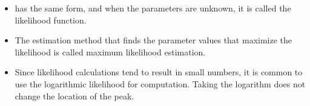 \begin{itemize}
	\item {} has the same form, and when the parameters are unknown, it is called the likelihood function.
	\item The estimation method that finds the parameter values that maximize the likelihood is called maximum likelihood estimation.
	\item Since likelihood calculations tend to result in small numbers, it is common to use the logarithmic likelihood for computation. Taking the logarithm does not change the location of the peak.
\end{itemize}
